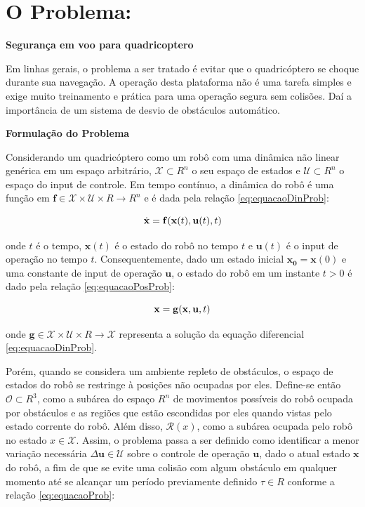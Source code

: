 \documentclass[a4paper, 12pt]{article}
\begin{document}
\newpage

\section{O Problema:}
\label{sec:prob}
\noindent\textbf{Segurança em voo para quadricoptero}

Em linhas gerais, o problema a ser tratado é evitar que o quadricóptero se choque durante sua navegação. A operação desta plataforma não é uma tarefa simples e exige muito treinamento e prática para uma operação segura sem colisões. Daí a importância de um sistema de desvio de obstáculos automático. 

\noindent\textbf{Formulação do Problema}

Considerando um quadricóptero como um robô com uma dinâmica não linear genérica em um espaço arbitrário, $\mathcal{X} \subset R^{n}$ o seu espaço de estados e $\mathcal{U} \subset R^{n}$ o espaço do input de controle. Em tempo contínuo, a dinâmica do robô é uma função em $\mathbf{f} \in \mathcal{X} \times \mathcal{U} \times R \rightarrow R^{n}$ e é dada pela relação \ref{eq:equacaoDinProb}:

\begin{equation}
\centering
\dot{\mathbf{x}} = \mathbf{f}(\mathbf{x}(t),\mathbf{u}(t),t)  
\label{eq:equacaoDinProb}
\end{equation}

\noindent onde $t$ é o tempo, $\mathbf{x}(t)$ é o estado do robô no tempo $t$ e $\mathbf{u}(t)$ é o input de operação no tempo $t$. Consequentemente, dado um estado inicial $\mathbf{x_0} = \mathbf{x}(0)$ e uma constante de input de operação $\mathbf{u}$, o estado do robô em um instante $t > 0$ é dado pela relação \ref{eq:equacaoPosProb}:
 

\begin{equation}
\centering
\mathbf{x} = \mathbf{g}(\mathbf{x},\mathbf{u},t)  
\label{eq:equacaoPosProb}
\end{equation}

\noindent onde $\mathbf{g} \in \mathcal{X} \times \mathcal{U} \times R \rightarrow \mathcal{X}$ representa a solução da equação diferencial \ref{eq:equacaoDinProb}.

Porém, quando se considera um ambiente repleto de obstáculos, o espaço de estados do robô se restringe à posições não ocupadas por eles. Define-se então $\mathcal{O} \subset R^3$, como a subárea do espaço $R^n$ de movimentos possíveis do robô ocupada por obstáculos e as regiões que estão escondidas por eles quando vistas pelo estado corrente do robô. Além disso, $\mathcal{R}(x)$, como a subárea ocupada pelo robô no estado $x \in \mathcal{X}$. Assim, o problema passa a ser definido como identificar a menor variação necessária  $\Delta\mathbf{u} \in \mathcal{U}$ sobre o controle de operação $\mathbf{u}$, dado o atual estado $\mathbf{x}$ do robô, a fim de que se evite uma colisão com algum obstáculo em qualquer momento até se alcançar um período previamente definido $\tau \in R$ conforme a relação \ref{eq:equacaoProb}:
\end{document}

